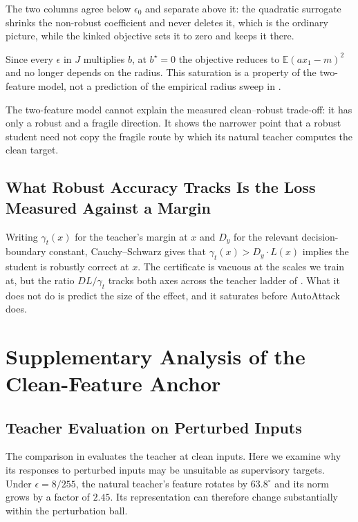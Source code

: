 The two columns agree below $\epsilon_0$ and separate above it: the quadratic surrogate shrinks the
non-robust coefficient and never deletes it, which is the ordinary picture, while the kinked objective
sets it to zero and keeps it there.

Since every $\epsilon$ in $J$ multiplies $b$, at $b^\star=0$ the objective reduces to
$\mathbb{E}(a x_1-m)^2$ and no longer depends on the radius. This saturation is a property of the
two-feature model, not a prediction of the empirical radius sweep in .

The two-feature model cannot explain the measured clean--robust trade-off: it has only a robust and
a fragile direction. It shows the narrower point that a robust student need not copy the fragile
route by which its natural teacher computes the clean target.

\subsection{What Robust Accuracy Tracks Is the Loss Measured Against a Margin}

Writing $\gamma_t(x)$ for the teacher's margin at $x$ and $D_y$ for the relevant decision-boundary
constant, Cauchy--Schwarz gives that $\gamma_t(x) > D_y \cdot L(x)$ implies the student is robustly
correct at $x$. The certificate is vacuous at the scales we train at, but the ratio $D L/\gamma_t$
tracks both axes across the teacher ladder of . What it does not do is predict
the size of the effect, and it saturates before AutoAttack does.

\section{Supplementary Analysis of the Clean-Feature Anchor}
\label{app:anchor_analysis}

\subsection{Teacher Evaluation on Perturbed Inputs}
\label{app:teacher_diagnostics}

The comparison in  evaluates the teacher at clean inputs. Here we examine why its
responses to perturbed inputs may be unsuitable as supervisory targets. Under $\epsilon=8/255$,
the natural teacher's feature rotates by $63.8^\circ$ and its norm grows by a factor of $2.45$.
Its representation can therefore change substantially within the perturbation ball.

